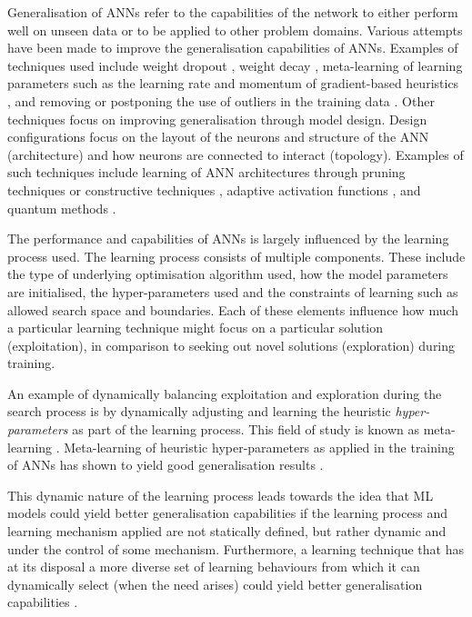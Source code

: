 Generalisation of \acp{ANN} refer to the capabilities of the network to either perform well on unseen data or to be applied to other problem domains. Various attempts have been made to improve the generalisation capabilities of
\acp{ANN}. Examples of techniques used include weight dropout
\cite{ref:srivastava:2014}, weight decay
\cite{ref:krogh:1992}, meta-learning of learning parameters
such as the learning rate and momentum of
gradient-based heuristics \cite{ref:zeiler:2012, ref:lv:2017, ref:darken:1992},
and removing or postponing the use of outliers in the training data \cite{ref:reeves:1998}. Other techniques focus on improving
generalisation through model design. Design configurations focus on the layout of the neurons and structure of the \acs{ANN} (architecture) and how neurons are connected to interact (topology). Examples of such
techniques include learning of \ac{ANN} architectures through pruning techniques
\cite{ref:cibas:1996, ref:engelbrecht:1996} or constructive techniques
\cite{ref:hassibi:1994, ref:lecun:1990}, adaptive activation functions
\cite{ref:engelbrecht:1995, ref:fletcher:1994}, and quantum methods
\cite{ref:wan:2017, ref:ricks:2004}.

The performance and capabilities of \acp{ANN} is largely influenced by the learning process used. The learning process consists of multiple components. These include the type of underlying optimisation algorithm used, how the model parameters are initialised, the hyper-parameters used and the constraints of learning such as allowed search space and boundaries. Each of these elements influence how much a particular learning technique might focus on a particular solution (exploitation), in comparison to seeking out novel solutions (exploration) during training.

An example of dynamically balancing exploitation and exploration during the
search process is by dynamically adjusting and learning the heuristic
\textit{hyper-parameters} as part of the learning
process. This field of study is known as meta-learning
\cite{ref:giraud:2004}. Meta-learning of heuristic
hyper-parameters as applied in the training of \acp{ANN} has shown to yield good
generalisation results \cite{ref:hospedales:2020, ref:vilalta:2002}.

This dynamic nature of the learning process leads towards the
idea that \ac{ML} models could yield better generalisation capabilities if the
learning process and learning mechanism applied are not statically defined, but
rather dynamic and under the control of some mechanism. Furthermore, a learning technique that has at its disposal a more diverse set
of learning behaviours from which it can dynamically select (when the need arises) could yield better generalisation capabilities \cite{ref:huang:2009}.

